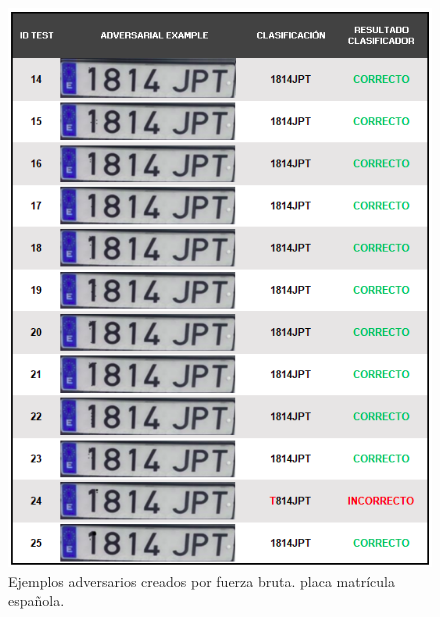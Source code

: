 \begin{figure}[!h]
    \centering
    \includegraphics[scale = 0.85]{Figures/figura_69_2.PNG}
    \decoRule
    \caption[Ejemplos adversarios creados por fuerza bruta. placa matrícula española.]{Ejemplos adversarios creados por fuerza bruta. placa matrícula española.}
    \label{fig:69_2}
\end{figure}
